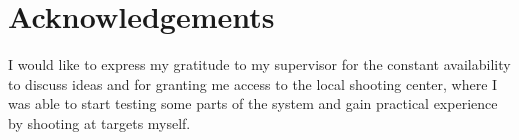\chapter*{Acknowledgements}

I would like to express my gratitude to my supervisor for the constant availability to discuss
ideas and for granting me access to the local shooting center, where I was able to start testing some parts of
the system and gain practical experience by shooting at targets myself.


\vspace{10mm}
